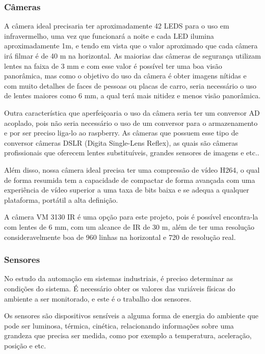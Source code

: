 \subsubsection{Câmeras}
\indent
\par
A câmera ideal precisaria ter aproximadamente 42 LEDS para o uso em infravermelho, uma vez que funcionará a noite e cada LED ilumina aproximadamente 1m, e tendo em vista que o valor aproximado que cada câmera irá filmar é de 40 m na horizontal. As maiorias das câmeras de segurança utilizam lentes na faixa de 3 mm e com esse valor é possível ter uma boa visão panorâmica, mas como o objetivo do uso da câmera é obter imagens nítidas e com  muito detalhes de faces de pessoas ou placas de carro, seria necessário o uso de lentes maiores como 6 mm, a qual terá mais nitidez e menos visão panorâmica.

\indent
\par
Outra característica que aperfeiçoaria o uso da câmera seria ter um conversor AD acoplado, pois não seria necessário o uso de um conversor para o armazenamento e por ser preciso liga-lo ao raspberry. As câmeras que possuem esse tipo de conversor câmeras DSLR (Digita Single-Lens Reflex), as quais são câmeras profissionais que oferecem lentes substituíveis, grandes sensores de imagens e etc..
\indent
\\\par

Além disso, nossa câmera ideal precisa ter uma compressão de vídeo H264, o qual de forma resumida tem a capacidade de compactar de forma avançada com uma experiência de vídeo superior a uma taxa de bits baixa e se adequa a qualquer plataforma, portátil a alta definição.
\indent
\\\par
A câmera VM 3130 IR é uma opção para este projeto, pois é possível encontra-la com lentes de 6 mm, com um alcance de IR de 30 m, além de ter uma resolução consideravelmente boa de 960 linhas na horizontal e 720 de resolução real.

\subsubsection{Sensores}
\indent
\par
No estudo da automação em sistemas industriais, é preciso determinar as condições do sistema. É necessário obter os valores das variáveis físicas do ambiente a ser monitorado, e este é o trabalho dos sensores.
\indent
\\\par	
Os sensores são dispositivos sensíveis a alguma forma de energia do ambiente que pode ser luminosa, térmica, cinética, relacionando informações sobre uma grandeza que precisa ser medida, como por exemplo a temperatura, aceleração, posição e etc.

